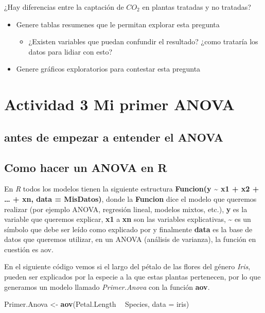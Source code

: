\documentclass[]{book}
\newenvironment{Shaded}{\begin{snugshade}}{\end{snugshade}}
\newcommand{\KeywordTok}[1]{\textcolor[rgb]{0.13,0.29,0.53}{\textbf{#1}}}
\newcommand{\DataTypeTok}[1]{\textcolor[rgb]{0.13,0.29,0.53}{#1}}
\newcommand{\StringTok}[1]{\textcolor[rgb]{0.31,0.60,0.02}{#1}}
\newcommand{\OperatorTok}[1]{\textcolor[rgb]{0.81,0.36,0.00}{\textbf{#1}}}
\newcommand{\NormalTok}[1]{#1}
\providecommand{\tightlist}{%
  \setlength{\itemsep}{0pt}\setlength{\parskip}{0pt}}
\begin{document}
¿Hay diferencias entre la captación de \(CO_2\) en plantas tratadas y no
tratadas?

\begin{itemize}
\tightlist
\item
  Genere tablas resumenes que le permitan explorar esta pregunta

  \begin{itemize}
  \tightlist
  \item
    ¿Existen variables que puedan confundir el resultado? ¿como trataría
    los datos para lidiar con esto?
  \end{itemize}
\item
  Genere gráficos exploratorios para contestar esta pregunta
\end{itemize}

\section{Actividad 3 Mi primer ANOVA}\label{actividad-3-mi-primer-anova}

\subsection{antes de empezar a entender el
ANOVA}\label{antes-de-empezar-a-entender-el-anova}

\subsection{Como hacer un ANOVA en R}\label{como-hacer-un-anova-en-r}

En \emph{R} todos los modelos tienen la siguiente estructura
\textbf{Funcion(y \textasciitilde{} x1 + x2 + \ldots{} + xn, data =
MisDatos)}, donde la \textbf{Funcion} dice el modelo que queremos
realizar (por ejemplo ANOVA, regresión lineal, modelos mixtos, etc.),
\textbf{y} es la variable que queremos explicar, \textbf{x1} a
\textbf{xn} son las variables explicativas, \textbf{\textasciitilde{}}
es un símbolo que debe ser leído como explicado por y finalmente
\textbf{data} es la base de datos que queremos utilizar, en un ANOVA
(análisis de varianza), la función en cuestión es aov.

En el siguiente código vemos si el largo del pétalo de las flores del
género \emph{Iris}, pueden ser explicados por la especie a la que estas
plantas pertenecen, por lo que generamos un modelo llamado
\emph{Primer.Anova} con la función \textbf{aov}.

\begin{Shaded}
\begin{Highlighting}[]
\NormalTok{Primer.Anova <-}\StringTok{ }\KeywordTok{aov}\NormalTok{(Petal.Length }\OperatorTok{~}\StringTok{ }\NormalTok{Species, }\DataTypeTok{data =}\NormalTok{ iris)}
\end{Highlighting}
\end{Shaded}
\end{document}
